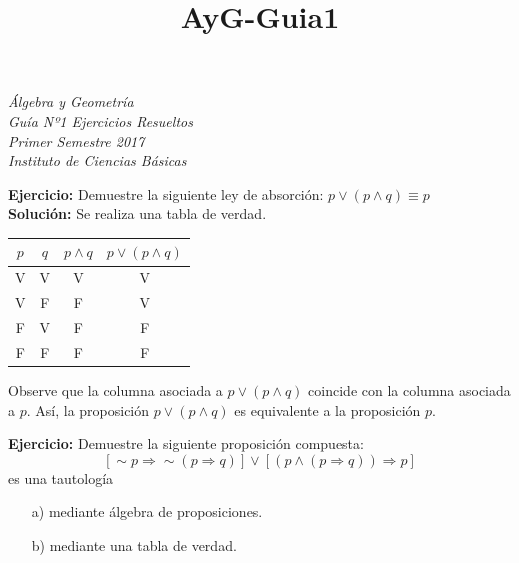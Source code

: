 \documentclass[a4paper,10pt]{article}
\title{AyG-Guia1}
\begin{document}
\begin{center}
\emph{Álgebra y Geometría} \\
\emph{Guía Nº1 Ejercicios Resueltos} \\
\emph{Primer Semestre 2017} \\
\emph{Instituto de Ciencias Básicas}
\end{center}


\vspace{5mm}

\textbf{Ejercicio:} Demuestre la siguiente ley de absorción: $p \vee (p \wedge q) \equiv p $ \\

\textbf{Solución:} Se realiza una tabla de verdad.

\begin{center}
\begin{tabular}{|l|l|l|l|}
\hline
\multicolumn{1}{|c|}{$p$} & \multicolumn{1}{c|}{$q$} & \multicolumn{1}{c|}{$p \wedge q$} & \multicolumn{1}{c|}{$p\vee (p\wedge q)$} \\
\hline \hline
\multicolumn{1}{|c|}{V} & \multicolumn{1}{c|}{V} & \multicolumn{1}{c|}{V} & \multicolumn{1}{c|}{V} \\
\hline
\multicolumn{1}{|c|}{V} & \multicolumn{1}{c|}{F} & \multicolumn{1}{c|}{F} & \multicolumn{1}{c|}{V} \\
\hline
\multicolumn{1}{|c|}{F} & \multicolumn{1}{c|}{V} & \multicolumn{1}{c|}{F} & \multicolumn{1}{c|}{F} \\
\hline
\multicolumn{1}{|c|}{F} & \multicolumn{1}{c|}{F} & \multicolumn{1}{c|}{F} & \multicolumn{1}{c|}{F} \\
\hline
\end{tabular}
\end{center}

Observe que la columna asociada a $p \vee (p \wedge q)$ coincide con la columna asociada a $p$. Así, la proposición $p\vee (p \wedge q)$ es equivalente a la proposición $p$.
\vspace{5mm}







\textbf{Ejercicio:} Demuestre la siguiente proposición compuesta:
                    \[ \left[ \sim p \Rightarrow \sim (p \Rightarrow q)\right] \vee \left[ \left(p \wedge (p \Rightarrow q)\right) \Rightarrow p \right] \]
                    es una tautología

                    \begin{enumerate}
                        \item[a)] mediante álgebra de proposiciones.
                        \item[b)] mediante una tabla de verdad.
                    \end{enumerate}
\end{document}
